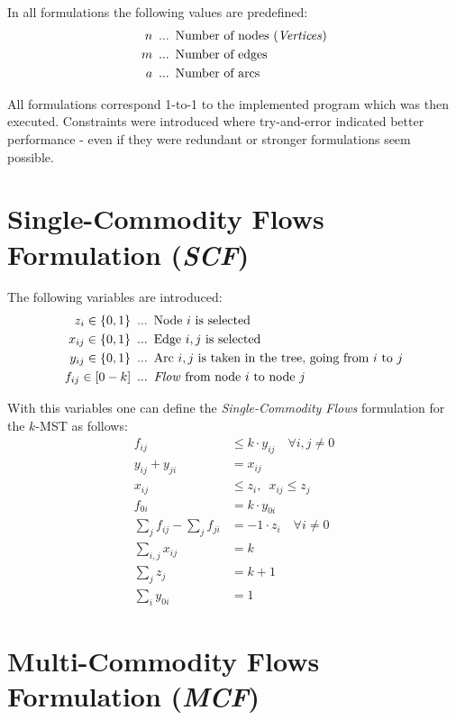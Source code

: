 \documentclass[11pt, oneside, a4paper, fleqn]{article}
\begin{document}
In all formulations the following values are predefined:
\begin{align*}
  n & \enskip ... \enskip \text{Number of nodes (\emph{Vertices})} \\
  m & \enskip ... \enskip \text{Number of edges} \\
  a & \enskip ... \enskip \text{Number of arcs}
\end{align*}

All formulations correspond 1-to-1 to the implemented
program which was then executed.
Constraints were introduced where try-and-error
indicated better performance - even if they were
redundant or stronger formulations seem possible.

\section*{Single-Commodity Flows Formulation (\emph{SCF})}

The following variables are introduced:
\begin{align*}
  z_i \in\{0,1\} & \enskip ... \enskip \text{Node $i$ is selected}\\
  x_{ij} \in\{0,1\} & \enskip ... \enskip\text{Edge $i,j$ is selected}\\
  y_{ij} \in\{0,1\} & \enskip ... \enskip\text{Arc $i,j$ is taken
             in the tree, going from $i$ to $j$} \\
  f_{ij} \in[0-k] & \enskip ... \enskip\text{\emph{Flow} from node $i$ to node $j$}
\end{align*}

With this variables one can define the \emph{Single-Commodity Flows}
formulation for the $k$-MST as follows:
\begin{align}
  f_{ij} & \le k\cdot y_{ij} \quad \forall i,j \ne 0 \\
  y_{ij} + y_{ji} & = x_{ij}\\
  x_{ij} & \le z_i, \enspace x_{ij} \le z_j \\
  f_{0i} & = k\cdot y_{0i}\\
  \sum_{j}f_{ij} - \sum_{j}f_{ji} & = -1\cdot z_i\quad \forall i \ne 0 \\
  \sum_{i,j}x_{ij} & = k \\
  \sum_{j} z_j & = k + 1 \\
  \sum_{i} y_{0i} & = 1
\end{align}

\section*{Multi-Commodity Flows Formulation (\emph{MCF})}
\end{document}
